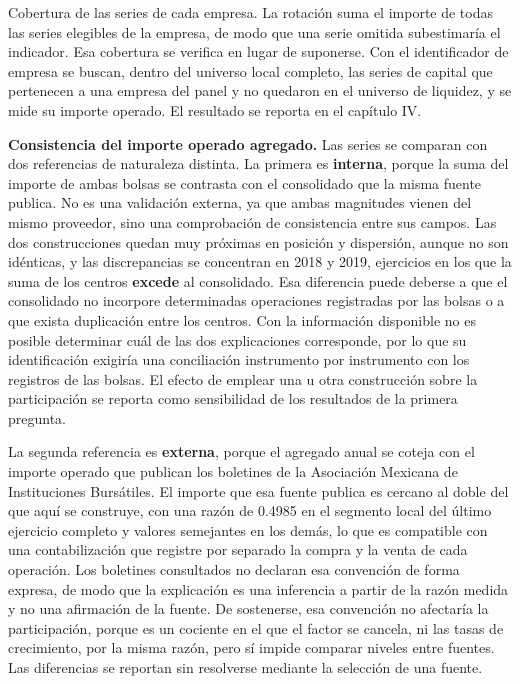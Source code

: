 Cobertura de las series de cada empresa. La rotación suma el importe de todas las series elegibles de la empresa, de modo que una serie omitida subestimaría el indicador. Esa cobertura se verifica en lugar de suponerse. Con el identificador de empresa se buscan, dentro del universo local completo, las series de capital que pertenecen a una empresa del panel y no quedaron en el universo de liquidez, y se mide su importe operado. El resultado se reporta en el capítulo IV.

\textbf{Consistencia del importe operado agregado.} Las series se comparan con dos referencias de naturaleza distinta. La primera es \textbf{interna}, porque la suma del importe de ambas bolsas se contrasta con el consolidado que la misma fuente publica. No es una validación externa, ya que ambas magnitudes vienen del mismo proveedor, sino una comprobación de consistencia entre sus campos. Las dos construcciones quedan muy próximas en posición y dispersión, aunque no son idénticas, y las discrepancias se concentran en 2018 y 2019, ejercicios en los que la suma de los centros \textbf{excede} al consolidado. Esa diferencia puede deberse a que el consolidado no incorpore determinadas operaciones registradas por las bolsas o a que exista duplicación entre los centros. Con la información disponible no es posible determinar cuál de las dos explicaciones corresponde, por lo que su identificación exigiría una conciliación instrumento por instrumento con los registros de las bolsas. El efecto de emplear una u otra construcción sobre la participación se reporta como sensibilidad de los resultados de la primera pregunta.

La segunda referencia es \textbf{externa}, porque el agregado anual se coteja con el importe operado que publican los boletines de la Asociación Mexicana de Instituciones Bursátiles. El importe que esa fuente publica es cercano al doble del que aquí se construye, con una razón de 0.4985 en el segmento local del último ejercicio completo y valores semejantes en los demás, lo que es compatible con una contabilización que registre por separado la compra y la venta de cada operación. Los boletines consultados no declaran esa convención de forma expresa, de modo que la explicación es una inferencia a partir de la razón medida y no una afirmación de la fuente. De sostenerse, esa convención no afectaría la participación, porque es un cociente en el que el factor se cancela, ni las tasas de crecimiento, por la misma razón, pero sí impide comparar niveles entre fuentes. Las diferencias se reportan sin resolverse mediante la selección de una fuente.

